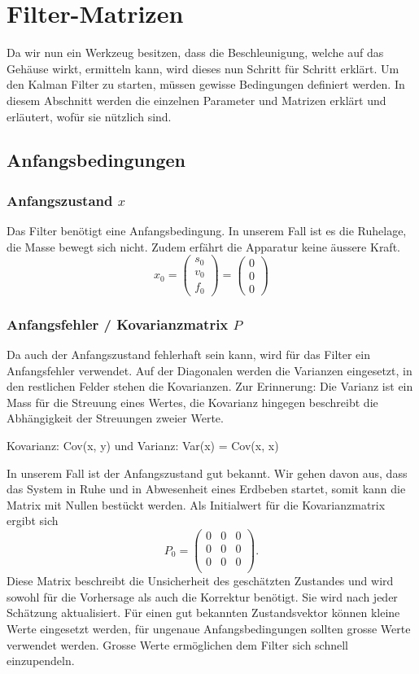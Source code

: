 \section{Filter-Matrizen}
Da wir nun ein Werkzeug besitzen, dass die Beschleunigung, welche auf das Gehäuse wirkt, ermitteln kann, wird dieses nun Schritt für Schritt erklärt. 
Um den Kalman Filter zu starten, müssen gewisse Bedingungen definiert werden. 
In diesem Abschnitt werden die einzelnen Parameter und Matrizen erklärt und erläutert, wofür sie nützlich sind. 

\subsection{Anfangsbedingungen}
\subsubsection*{Anfangszustand $x$}
Das Filter benötigt eine Anfangsbedingung. 
In unserem Fall ist es die Ruhelage, die Masse bewegt sich nicht. 
Zudem erfährt die Apparatur keine äussere Kraft.
\[ {x_0 }= \left( \begin{array}{c} {s_0}\\ {v_0}\\{f_0}\end{array}\right) = \left( \begin{array}{c} 0\\ 0\\ 0\end{array}\right) \]

\subsubsection*{Anfangsfehler / Kovarianzmatrix $P$}
Da auch der Anfangszustand fehlerhaft sein kann, wird für das Filter ein Anfangsfehler verwendet. 
Auf der Diagonalen werden die Varianzen eingesetzt, in den restlichen Felder stehen die Kovarianzen.
Zur Erinnerung: Die Varianz ist ein Mass für die Streuung eines Wertes, die Kovarianz hingegen beschreibt die Abhängigkeit der Streuungen zweier Werte.

Kovarianz: Cov(x, y) und Varianz: Var(x) = Cov(x, x)

In unserem Fall ist der Anfangszustand gut bekannt. 
Wir gehen davon aus, dass das System in Ruhe und in Abwesenheit eines Erdbeben startet, somit kann die Matrix mit Nullen bestückt werden. 
Als Initialwert für die Kovarianzmatrix ergibt sich
\[ 
{P_0 }=
\left(
\begin{array}{ccc} 	
0 & 0 &0 \\ 
0 &0 & 0 \\ 
0 & 0 &0 \\
\end{array}
\right).
 \] 
Diese Matrix beschreibt die Unsicherheit des geschätzten Zustandes und wird sowohl für die Vorhersage als auch die Korrektur benötigt. 
Sie wird nach jeder Schätzung aktualisiert. 
Für einen gut bekannten Zustandsvektor können kleine Werte eingesetzt werden, für ungenaue Anfangsbedingungen sollten grosse Werte verwendet werden. 
Grosse Werte ermöglichen dem Filter sich schnell einzupendeln. 

